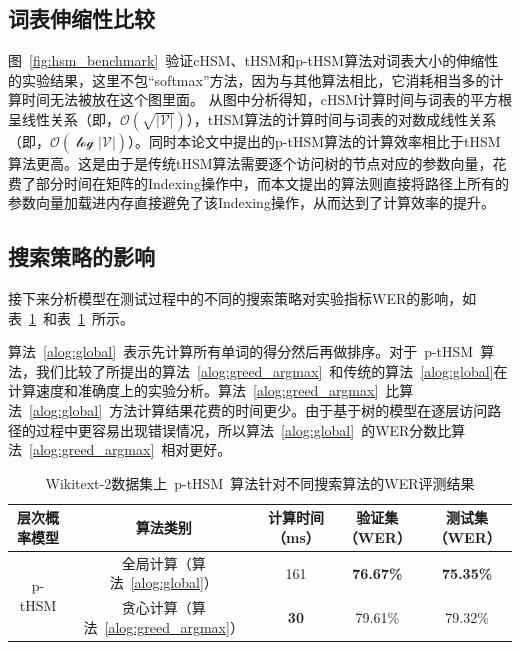 \subsection{词表伸缩性比较}
图~\ref{fig:hsm_benchmark}~验证cHSM、tHSM和p-tHSM算法对词表大小的伸缩性的实验结果，这里不包``softmax''方法，因为与其他算法相比，它消耗相当多的计算时间无法被放在这个图里面。 从图中分析得知，cHSM计算时间与词表的平方根呈线性关系（即，$\mathcal{O(\sqrt{|V|})}$），tHSM算法的计算时间与词表的对数成线性关系 （即，$\mathcal{O(\log{|V|})}$）。同时本论文中提出的p-tHSM算法的计算效率相比于tHSM算法更高。这是由于是传统tHSM算法需要逐个访问树的节点对应的参数向量，花费了部分时间在矩阵的Indexing操作中，而本文提出的算法则直接将路径上所有的参数向量加载进内存直接避免了该Indexing操作，从而达到了计算效率的提升。


\subsection{搜索策略的影响}
接下来分析模型在测试过程中的不同的搜索策略对实验指标WER的影响，如表~\ref{tab:search}~和表~\ref{tab:search}~所示。


算法~\ref{alog:global}~表示先计算所有单词的得分然后再做排序。对于~p-tHSM~算法，我们比较了所提出的算法~\ref{alog:greed_argmax}~和传统的算法~\ref{alog:global}在计算速度和准确度上的实验分析。算法~\ref{alog:greed_argmax}~比算法~\ref{alog:global}~方法计算结果花费的时间更少。由于基于树的模型在逐层访问路径的过程中更容易出现错误情况，所以算法~\ref{alog:global}~的WER分数比算法~\ref{alog:greed_argmax}~相对更好。
\begin{table}[!ht]
  \centering
  \caption{Wikitext-2数据集上~p-tHSM~算法针对不同搜索算法的WER评测结果\label{tab:search}}
\begin{tabular}{ccccc}
  \toprule
     层次概率模型   & 算法类别&计算时间（ms）&验证集（WER）& 测试集（WER）\\ \midrule
  \multirow{2}{*}{p-tHSM}  &全局计算（算法~\ref{alog:global}）&161& \textbf{76.67\%}&\textbf{75.35\%}\\
        &贪心计算（算法~\ref{alog:greed_argmax}）&\textbf{30} & 79.61\%&79.32\%\\
  \bottomrule
\end{tabular}
\end{table}

